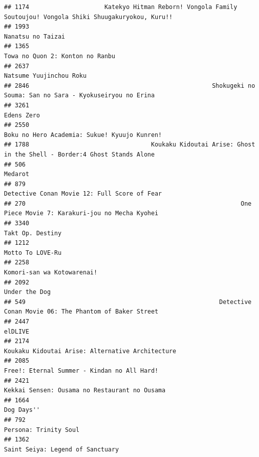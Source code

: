 \documentclass[
]{article}
\begin{document}
\begin{verbatim}
## 1174                     Katekyo Hitman Reborn! Vongola Family Soutoujou! Vongola Shiki Shuugakuryokou, Kuru!!
## 1993                                                                                         Nanatsu no Taizai
## 1365                                                                           Towa no Quon 2: Konton no Ranbu
## 2637                                                                                   Natsume Yuujinchou Roku
## 2846                                                   Shokugeki no Souma: San no Sara - Kyokuseiryou no Erina
## 3261                                                                                                Edens Zero
## 2550                                                              Boku no Hero Academia: Sukue! Kyuujo Kunren!
## 1788                                  Koukaku Kidoutai Arise: Ghost in the Shell - Border:4 Ghost Stands Alone
## 506                                                                                                    Medarot
## 879                                                               Detective Conan Movie 12: Full Score of Fear
## 270                                                            One Piece Movie 7: Karakuri-jou no Mecha Kyohei
## 3340                                                                                          Takt Op. Destiny
## 1212                                                                                          Motto To LOVE-Ru
## 2258                                                                                Komori-san wa Kotowarenai!
## 2092                                                                                             Under the Dog
## 549                                                      Detective Conan Movie 06: The Phantom of Baker Street
## 2447                                                                                                   elDLIVE
## 2174                                                          Koukaku Kidoutai Arise: Alternative Architecture
## 2085                                                               Free!: Eternal Summer - Kindan no All Hard!
## 2421                                                             Kekkai Sensen: Ousama no Restaurant no Ousama
## 1664                                                                                                Dog Days''
## 792                                                                                      Persona: Trinity Soul
## 1362                                                                          Saint Seiya: Legend of Sanctuary

\end{verbatim}
\end{document}

